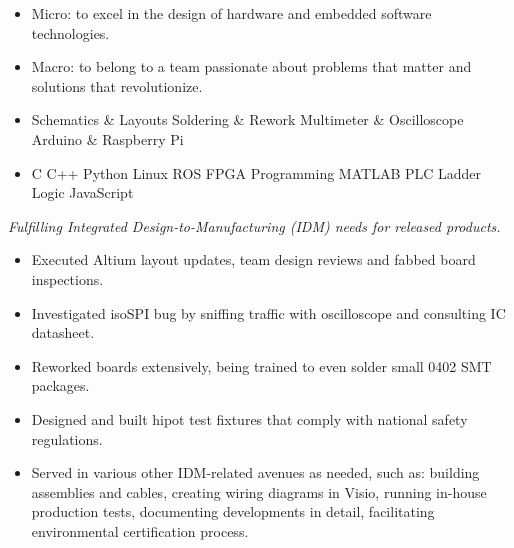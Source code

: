 \documentclass{resume}
\begin{document}




\begin{itemize}[parsep=0.5ex]
  \item Micro: to excel in the design of hardware and embedded software technologies.
  \item Macro: to belong to a team passionate about problems that matter and solutions that revolutionize.
\end{itemize}


\begin{itemize}[parsep=0.5ex]
  \item %
  Schematics \& Layouts\textperiodcentered
  Soldering \& Rework\textperiodcentered
  Multimeter \& Oscilloscope\textperiodcentered
  Arduino \& Raspberry Pi
  \hfill \faBolt

  \item %
  C\textperiodcentered 
  C++\textperiodcentered
  Python\textperiodcentered
  Linux\textperiodcentered
  ROS\textperiodcentered
  FPGA Programming\textperiodcentered
  MATLAB\textperiodcentered
  PLC Ladder Logic\textperiodcentered
  JavaScript%
  \hfill \faCode

\end{itemize}


\textit{Fulfilling Integrated Design-to-Manufacturing (IDM) needs for released products.}
\begin{itemize}
  \item Executed Altium layout updates, team design reviews and fabbed board inspections.
  \item Investigated isoSPI bug by sniffing traffic with oscilloscope and consulting IC datasheet.
  \item Reworked boards extensively, being trained to even solder small 0402 SMT packages.
  \item Designed and built hipot test fixtures that comply with national safety regulations.
  \item Served in various other IDM-related avenues as needed, such as: building assemblies and cables, creating wiring diagrams in Visio, running in-house production tests, documenting developments in detail, facilitating environmental certification process.
\end{itemize}
\end{document}
